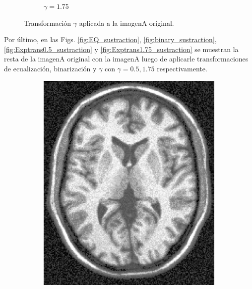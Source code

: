 \documentclass[11pt,twocolumn,twoside]{opticajnl}
\begin{document}
\begin{figure}[H]
\begin{subfigure}[h]{0.32\linewidth}
            \caption{$\gamma = 1.75$} 
         \end{subfigure}
    \caption{Transformación $\gamma$ aplicada a la imagenA original.}
    \label{fig:Exptrans}
\end{figure}

Por último, en las Figs. \ref{fig:EQ_sustraction}, \ref{fig:binary_sustraction}, \ref{fig:Exptrans0.5_sustraction} y \ref{fig:Exptrans1.75_sustraction} se muestran la resta de la imagenA original con la imagenA luego de aplicarle transformaciones de ecualización, binarización y $\gamma$ con $\gamma = 0.5,1.75$ respectivamente.

\begin{figure}[h]
    \centering
        \begin{subfigure}[h]{0.24\linewidth}
            \centering
            \includegraphics[width=\textwidth]{Figuras/ImageA_EQ}
        \end{subfigure}
        \begin{subfigure}[h]{0.24\linewidth}
            \centering

\end{subfigure}
\end{figure}
\end{document}
